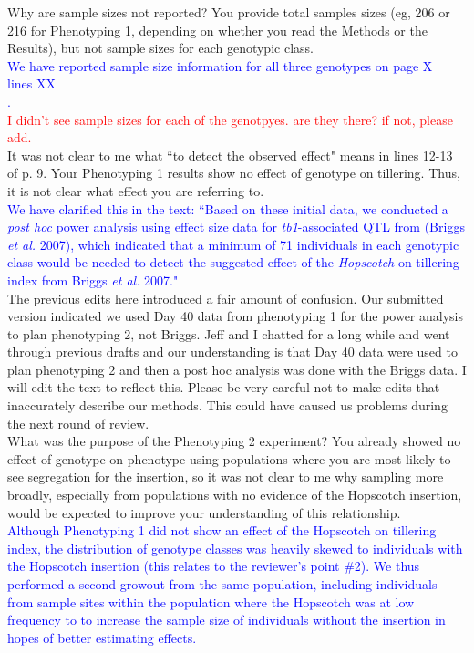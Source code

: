 \documentclass[11pt]{article}
\newcommand{\res}[1]{\noindent \textcolor{blue}{{#1}} \\}
\newcommand{\jri}[1]{\noindent \textcolor{red}{{#1}} \\}
\newcommand{\mbh}[1]{\noindent \textcolor{Dandelion}{{#1}}\\}
\begin{document}
Why are sample sizes not reported?  You provide total samples sizes (eg, 206 or 216 for Phenotyping 1, depending on whether you read the Methods or the Results), but not sample sizes for each genotypic class.\\

\res{We have reported sample size information for all three genotypes on page \mbh{X} lines \mbh{XX}.} \jri{I didn't see sample sizes for each of the genotpyes. are they there? if not, please add.}

It was not clear to me what ``to detect the observed effect" means in lines 12-13 of p. 9.  Your Phenotyping 1 results show no effect of genotype on tillering.  Thus, it is not clear what effect you are referring to.\\

\res{We have clarified this in the text: ``Based on these initial data, we conducted a \emph{post hoc} power analysis using effect size data for \emph{tb1}-associated QTL from (Briggs \emph{et al.} 2007), which indicated that a minimum of 71 individuals in each genotypic class would be needed to detect the suggested effect of the \emph{Hopscotch} on tillering index from Briggs \emph{et al.} 2007."}
\mbh{The previous edits here introduced a fair amount of confusion.  Our submitted version indicated we used Day 40 data from phenotyping 1 for the power analysis to plan phenotyping 2, not Briggs. Jeff and I chatted for a long while and went through previous drafts and our understanding is that Day 40 data were used to plan phenotyping 2 and then a post hoc analysis was done with the Briggs data.  I will edit the text to reflect this.  Please be very careful not to make edits that inaccurately describe our methods.  This could have caused us problems during the next round of review.}

What was the purpose of the Phenotyping 2  experiment?  You already showed no effect of genotype on phenotype using populations where you are most likely to see segregation for the insertion, so it was not clear to me why sampling more broadly, especially from populations with no evidence of the Hopscotch insertion, would be expected to improve your understanding of this relationship.\\

\res{Although Phenotyping 1 did not show an effect of the Hopscotch on tillering index, the distribution of genotype classes was  heavily skewed to individuals with the Hopscotch insertion (this relates to the reviewer's point \#2).  We thus performed a second growout from the same population, including individuals from sample sites within the population where the Hopscotch was at low frequency to to increase the sample size of individuals without the insertion in hopes of better estimating effects.}
\end{document}
